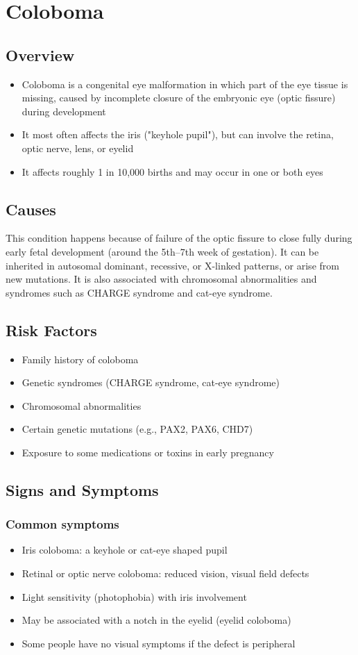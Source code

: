 \chapter{Coloboma}
\label{sec:Coloboma}

\section{Overview}
\begin{itemize}[noitemsep]
  \item Coloboma is a congenital eye malformation in which part of the eye tissue is missing, caused by incomplete closure of the embryonic eye (optic fissure) during development
  \item It most often affects the iris ("keyhole pupil"), but can involve the retina, optic nerve, lens, or eyelid
  \item It affects roughly 1 in 10,000 births and may occur in one or both eyes
\end{itemize}
\section{Causes}
This condition happens because of failure of the optic fissure to close fully during early fetal development (around the 5th--7th week of gestation). It can be inherited in autosomal dominant, recessive, or X-linked patterns, or arise from new mutations. It is also associated with chromosomal abnormalities and syndromes such as CHARGE syndrome and cat-eye syndrome.
\section{Risk Factors}
\begin{itemize}[noitemsep]
  \item Family history of coloboma
  \item Genetic syndromes (CHARGE syndrome, cat-eye syndrome)
  \item Chromosomal abnormalities
  \item Certain genetic mutations (e.g., PAX2, PAX6, CHD7)
  \item Exposure to some medications or toxins in early pregnancy
\end{itemize}
\section{Signs and Symptoms}
\subsection{Common symptoms}
\begin{itemize}[noitemsep]
  \item Iris coloboma: a keyhole or cat-eye shaped pupil
  \item Retinal or optic nerve coloboma: reduced vision, visual field defects
  \item Light sensitivity (photophobia) with iris involvement
  \item May be associated with a notch in the eyelid (eyelid coloboma)
  \item Some people have no visual symptoms if the defect is peripheral
\end{itemize}
